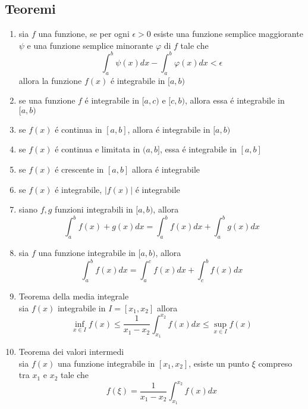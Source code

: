 \documentclass{exam}
\begin{document}
	\subsection{Teoremi}
		\begin{enumerate}
			\item
				sia $f$ una funzione, se per ogni $\epsilon >0$ esiste una funzione semplice maggiorante $\psi$ e una funzione semplice minorante $\varphi$ di $f$ tale che
			 \begin{equation}
			 	\int_a^b \psi(x)dx - \int_a^b \varphi(x)dx < \epsilon
			 \end{equation}
			 allora la funzione $f(x)$ \'e integrabile in $[a,b)$
			\item
				se una funzione $f$ \'e integrabile in $[a,c)$ e $[c,b)$, allora essa \'e integrabile in $[a,b)$
			\item
				se $f(x)$ \'e continua in $[a,b]$, allora \'e integrabile in $[a,b)$
			\item
				se $f(x)$ \'e continua e limitata in $(a,b]$, essa \'e integrabile in $[a,b]$
			\item
				se $f(x)$ \'e crescente in $[a,b]$ allora \'e integrabile
			\item 
				se $f(x)$ \'e integrabile, $|f(x)|$ \'e integrabile
			\item
				siano $f,g$ funzioni integrabili in $[a,b)$, allora
				\begin{equation}
					\int_a^b f(x)+g(x) dx=\int_a^b f(x)dx + \int_a^b g(x)dx
				\end{equation}
			\item
				sia $f$ una funzione integrabile in $[a,b)$, allora
				\begin{equation}
					\int_a^b f(x)dx=\int_a^c f(x)dx + \int_c^b f(x)dx
				\end{equation}
			\item{Teorema della media integrale}\\
				sia $f(x)$ integrabile in $I=[x_1,x_2]$ allora 
				\begin{equation}
					\inf_{x\in I}f(x)\le\frac{1}{x_1-x_2}\int_{x_1}^{x_2} f(x)dx\le \sup_{x\in I}f(x)
				\end{equation}
			\item{Teorema dei valori intermedi}\\
				sia $f(x)$ una funzione integrabile in $[x_1,x_2]$, esiste un punto $\xi$ compreso tra $x_1$ e $x_2$ tale che 
				\begin{equation}
					f(\xi)=\frac{1}{x_1-x_2}\int_{x_1}^{x_2} f(x)dx

\end{equation}
\end{enumerate}
\end{document}
